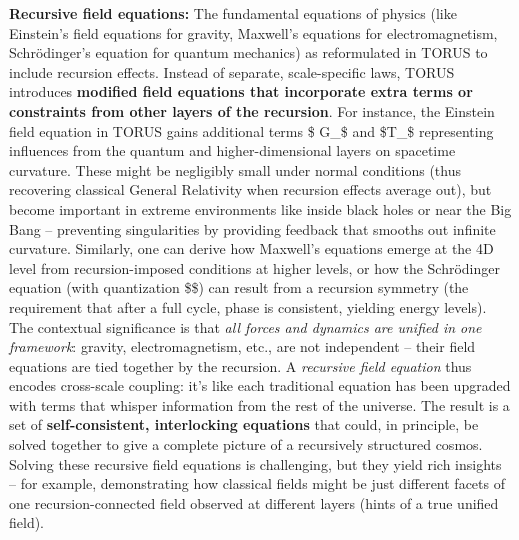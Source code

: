 \documentclass[]{article}
\begin{document}
\textbf{Recursive field equations:} The fundamental equations of physics
(like Einstein's field equations for gravity, Maxwell's equations for
electromagnetism, Schrödinger's equation for quantum mechanics) as
reformulated in TORUS to include recursion effects. Instead of separate,
scale-specific laws, TORUS introduces \textbf{modified field equations
that incorporate extra terms or constraints from other layers of the
recursion}​. For instance, the Einstein field equation in TORUS gains
additional terms \$\Delta
G_{\mu\nu}\$ and
\$\Delta T_{\mu\nu}\$
representing influences from the quantum and higher-dimensional layers
on spacetime curvature​. These might be negligibly small under normal
conditions (thus recovering classical General Relativity when recursion
effects average out)​, but become important in extreme environments like
inside black holes or near the Big Bang -- preventing singularities by
providing feedback that smooths out infinite curvature​. Similarly, one
can derive how Maxwell's equations emerge at the 4D level from
recursion-imposed conditions at higher levels​, or how the Schrödinger
equation (with quantization \$\hbar\$) can result from a recursion
symmetry (the requirement that after a full cycle, phase is consistent,
yielding energy levels)​. The contextual significance is that \emph{all
forces and dynamics are unified in one framework}: gravity,
electromagnetism, etc., are not independent -- their field equations are
tied together by the recursion. A \emph{recursive field equation} thus
encodes cross-scale coupling: it's like each traditional equation has
been upgraded with terms that whisper information from the rest of the
universe. The result is a set of \textbf{self-consistent, interlocking
equations} that could, in principle, be solved together to give a
complete picture of a recursively structured cosmos. Solving these
recursive field equations is challenging, but they yield rich insights
-- for example, demonstrating how classical fields might be just
different facets of one recursion-connected field observed at different
layers (hints of a true unified field).
\end{document}

